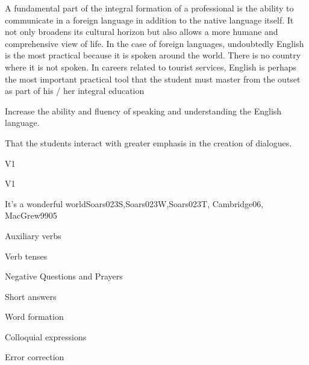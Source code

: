 \begin{syllabus}


\begin{justification}
A fundamental part of the integral formation of a professional is the ability to communicate in a foreign language in addition to the native language itself.
It not only broadens its cultural horizon but also allows a more humane and comprehensive view of life. In the case of foreign languages, undoubtedly English is the most practical because it is spoken around the world. There is no country where it is not spoken. In careers related to tourist services, English is perhaps the most important practical tool that the student must master from the outset as part of his / her integral education
\end{justification}

\begin{goals}
\item Increase the ability and fluency of speaking and understanding the English language.
\item That the students interact with greater emphasis in the creation of dialogues.
\end{goals}

\begin{competences}{V1}
    \item {}
\end{competences}

\begin{outcomes}{V1}
\item {}
\item {}
\end{outcomes}

\begin{unit}{It's a wonderful world}{Soars023S,Soars023W,Soars023T, Cambridge06, MacGrew99}{0}{5}
   \begin{topics}
      \item Auxiliary verbs
      \item Verb tenses
      \item Negative Questions and Prayers
      \item Short answers
      \item Word formation
      \item Colloquial expressions
      \item Error correction
   \end{topics}


\end{unit}
\end{syllabus}
